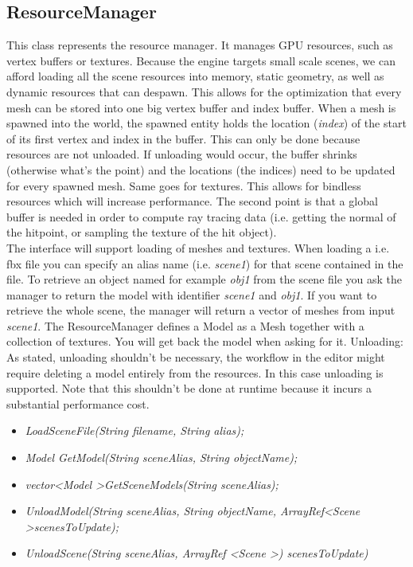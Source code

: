 \documentclass{article}
\begin{document}
\subsection{ResourceManager}
This class represents the resource manager. 
It manages GPU resources, such as vertex buffers or textures.
Because the engine targets small scale scenes, we can afford loading all the scene resources into memory, static geometry, as well as dynamic resources that can despawn.
This allows for the optimization that every mesh can be stored into one big vertex buffer and index buffer.
When a mesh is spawned into the world, the spawned entity holds the location (\textit{index}) of the start of its first vertex and index in the buffer.
This can only be done because resources are not unloaded. 
If unloading would occur, the buffer shrinks (otherwise what's the point) and the locations (the indices) need to be updated for every spawned mesh.
Same goes for textures. 
This allows for bindless resources which will increase performance. 
The second point is that a global buffer is needed in order to compute ray tracing data (i.e. getting the normal of the hitpoint, or sampling the texture of the hit object).\\
The interface will support loading of meshes and textures.
When loading a i.e. fbx file you can specify an alias name (i.e. \textit{scene1}) for that scene contained in the file. 
To retrieve an object named for example \textit{obj1} from the scene file you ask the manager to return the model with identifier \textit{scene1} and \textit{obj1}. 
If you want to retrieve the whole scene, the manager will return a vector of meshes from input \textit{scene1}.  
The ResourceManager defines a Model as a Mesh together with a collection of textures.
You will get back the model when asking for it. 
Unloading: As stated, unloading shouldn't be necessary, the workflow in the editor might require deleting a model entirely from the resources. 
In this case unloading is supported. Note that this shouldn't be done at runtime because it incurs a substantial performance cost. 
\begin{tcolorbox}[colback=blue!5!white,colframe=blue!75!black,title=ResourceManager Interface]
    \begin{itemize}
        \item \textit{LoadSceneFile(String filename, String alias);}
        \item \textit{Model GetModel(String sceneAlias, String objectName);}
        \item \textit{vector\textless Model \textgreater GetSceneModels(String sceneAlias);}
        \item \textit{UnloadModel(String sceneAlias, String objectName, ArrayRef\textless Scene \textgreater scenesToUpdate);}
        \item \textit{UnloadScene(String sceneAlias, ArrayRef \textless Scene \textgreater) scenesToUpdate)}
    \end{itemize}    
\end{tcolorbox}
\end{document}
